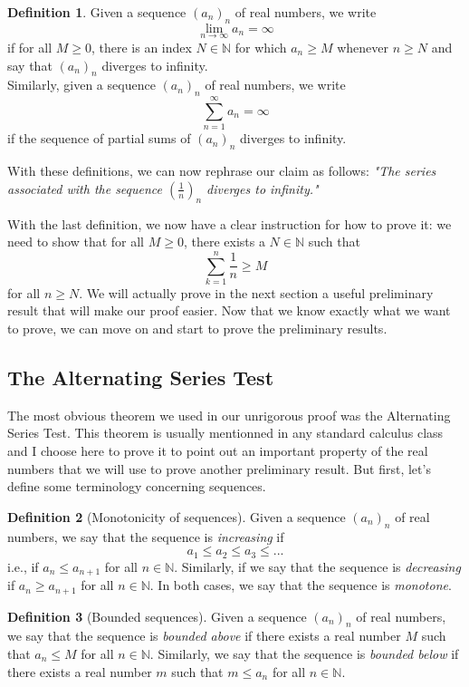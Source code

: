 \documentclass[12pt]{article}
\newcommand{\N}{\mathbb{N}}
\theoremstyle{definition}
\newtheorem*{definition}{Definition}
\newcounter{prop}[section]
\begin{document}
\begin{definition}
    Given a sequence $(a_n)_n$ of real numbers, we write
    $$\lim_{n \rightarrow \infty}a_n = \infty$$
    if for all $M \geq 0$, there is an index $N \in \N$ for which $a_n \geq M$ whenever $n \geq N$ and say that $(a_n)_n$ diverges to infinity. \\
    Similarly, given a sequence $(a_n)_n$ of real numbers, we write
    $$\sum_{n=1}^{\infty}a_n = \infty$$
    if the sequence of partial sums of $(a_n)_n$ diverges to infinity.\\
\end{definition}

With these definitions, we can now rephrase our claim as follows: \textit{"The series associated with the sequence $(\frac{1}{n})_n$ diverges to infinity." } 

With the last definition, we now have a clear instruction for how to prove it: we need to show that for all $M \geq 0$, there exists a $N \in \N$ such that
$$\sum_{k=1}^{n}\frac{1}{n} \geq M$$
for all $n \geq N$. We will actually prove in the next section a useful preliminary result that will make our proof easier. Now that we know exactly what we want to prove, we can move on and start to prove the preliminary results.

\subsection{The Alternating Series Test}

The most obvious theorem we used in our unrigorous proof was the Alternating Series Test. This theorem is usually mentionned in any standard calculus class and I choose here to prove it to point out an important property of the real numbers that we will use to prove another preliminary result. But first, let's define some terminology concerning sequences.

\begin{definition}[Monotonicity of sequences]
    Given a sequence $(a_n)_n$ of real numbers, we say that the sequence is \textit{increasing} if
    $$a_1 \leq a_2 \leq a_3 \leq ... $$
    i.e., if $a_n \leq a_{n+1}$ for all $n \in \N$. Similarly, if we say that the sequence is \textit{decreasing} if $a_n \geq a_{n+1}$ for all $n \in \N$. In both cases, we say that the sequence is \textit{monotone}.
\end{definition}

\begin{definition}[Bounded sequences]
    Given a sequence $(a_n)_n$ of real numbers, we say that the sequence is \textit{bounded above} if there exists a real number $M$ such that $a_n \leq M$ for all $n \in \N$. Similarly, we say that the sequence is \textit{bounded below} if there exists a real number $m$ such that $m \leq a_n$ for all $n \in \N$.
\end{definition}
\end{document}
